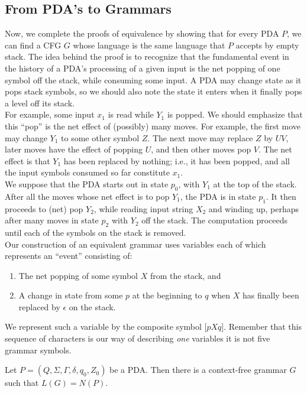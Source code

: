 \documentclass[]{article}
\begin{document}
  \subsection*{From PDA's to Grammars}
    Now, we complete the proofs of equivalence by showing that for every PDA
    $P$, we can find a CFG $G$ whose language is the same language that $P$
    accepts by empty stack. The idea behind the proof is to recognize that the
    fundamental event in the history of a PDA's processing of a given input is
    the net popping of one symbol off the stack, while consuming some input. A
    PDA may change state as it pops stack symbols, so we should also note the
    state it enters when it finally pops a level off its stack. \\
    \indent For example, some input $x_1$ is read while $Y_1$ is popped. We
    should emphasize that this ``pop'' is the net effect of (possibly) many
    moves. For example, the first move may change $Y_1$ to some other symbol
    $Z$. The next move may replace $Z$ by $UV$, later moves have the effect of
    popping $U$, and then other moves pop $V$. The net effect is that $Y_1$ has
    been replaced by nothing; i.e., it has been popped, and all the input
    symbols consumed so far constitute $x_1$. \\
    \indent We suppose that the PDA starts out in state $p_0$, with $Y_1$ at the
    top of the stack. After all the moves whose net effect is to pop $Y_1$, the
    PDA is in state $p_1$. It then proceeds to (net) pop $Y_2$, while reading
    input string $X_2$ and winding up, perhaps after many moves in state $p_2$
    with $Y_2$ off the stack. The computation proceeds until each of the symbols
    on the stack is removed. \\
    \indent Our construction of an equivalent grammar uses variables each of
    which represents an ``event'' consisting of:
      \begin{enumerate}
        \item The net popping of some symbol $X$ from the stack, and
        \item A change in state from some $p$ at the beginning to $q$ when $X$
        has finally been replaced by $\epsilon$ on the stack.
      \end{enumerate}
    We represent such a variable by the composite symbol $\lbrack pXq \rbrack$.
    Remember that this sequence of characters is our way of describing
    \emph{one} variables it is not five grammar symbols.
      \begin{thm}
        Let $P = (Q,\Sigma,\Gamma,\delta,q_0,Z_0)$ be a PDA. Then there is a
        context-free grammar $G$ such that $L(G) = N(P)$.
      \end{thm}
\end{document}
